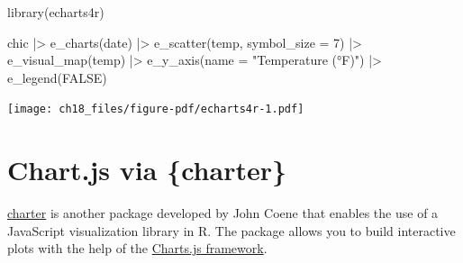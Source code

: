 \documentclass[
  letterpaper,
  DIV=11,
  numbers=noendperiod]{scrreprt}
\newenvironment{Shaded}{\begin{snugshade}}{\end{snugshade}}
\newcommand{\AttributeTok}[1]{\textcolor[rgb]{0.40,0.45,0.13}{#1}}
\newcommand{\ConstantTok}[1]{\textcolor[rgb]{0.56,0.35,0.01}{#1}}
\newcommand{\DecValTok}[1]{\textcolor[rgb]{0.68,0.00,0.00}{#1}}
\newcommand{\DocumentationTok}[1]{\textcolor[rgb]{0.37,0.37,0.37}{\textit{#1}}}
\newcommand{\FunctionTok}[1]{\textcolor[rgb]{0.28,0.35,0.67}{#1}}
\newcommand{\NormalTok}[1]{\textcolor[rgb]{0.00,0.23,0.31}{#1}}
\newcommand{\OtherTok}[1]{\textcolor[rgb]{0.00,0.23,0.31}{#1}}
\newcommand{\SpecialCharTok}[1]{\textcolor[rgb]{0.37,0.37,0.37}{#1}}
\newcommand{\StringTok}[1]{\textcolor[rgb]{0.13,0.47,0.30}{#1}}
\begin{document}
\begin{Shaded}
\begin{Highlighting}[]
\FunctionTok{library}\NormalTok{(echarts4r)}

\NormalTok{chic }\SpecialCharTok{|\textgreater{}}
  \FunctionTok{e\_charts}\NormalTok{(date) }\SpecialCharTok{|\textgreater{}}
  \FunctionTok{e\_scatter}\NormalTok{(temp, }\AttributeTok{symbol\_size =} \DecValTok{7}\NormalTok{) }\SpecialCharTok{|\textgreater{}}
  \FunctionTok{e\_visual\_map}\NormalTok{(temp) }\SpecialCharTok{|\textgreater{}}
  \FunctionTok{e\_y\_axis}\NormalTok{(}\AttributeTok{name =} \StringTok{"Temperature (°F)"}\NormalTok{) }\SpecialCharTok{|\textgreater{}}
  \FunctionTok{e\_legend}\NormalTok{(}\ConstantTok{FALSE}\NormalTok{)}
\end{Highlighting}
\end{Shaded}

\texttt{[image: ch18\_files/figure-pdf/echarts4r-1.pdf]}

\section{Chart.js via \{charter\}}\label{chart.js-via-charter}

\href{https://github.com/JohnCoene/charter}{charter} is another package
developed by John Coene that enables the use of a JavaScript
visualization library in R. The package allows you to build interactive
plots with the help of the \href{https://www.chartjs.org/}{Charts.js
framework}.

\begin{Shaded}
\end{Shaded}
\end{document}
